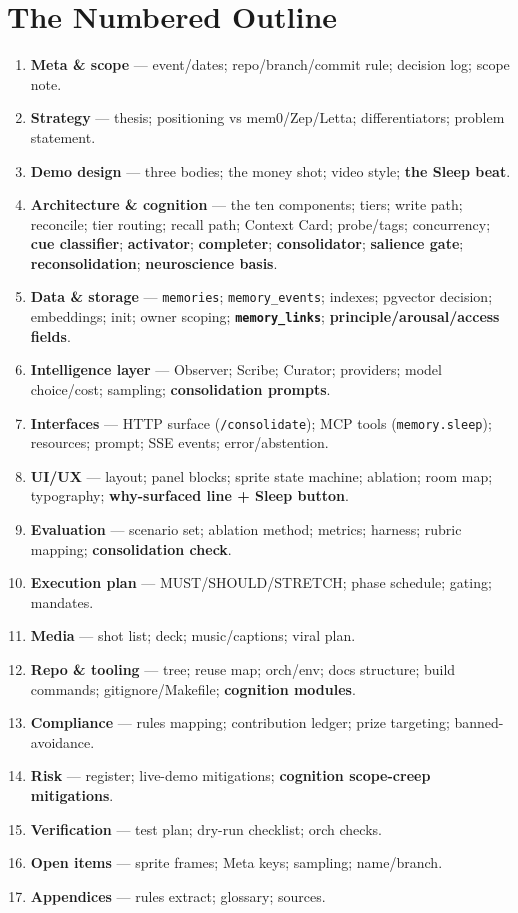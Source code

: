 \section{The Numbered Outline}
\begin{enumerate}
  \item \textbf{Meta \& scope} --- event/dates; repo/branch/commit rule; decision log; scope note.
  \item \textbf{Strategy} --- thesis; positioning vs mem0/Zep/Letta; differentiators; problem statement.
  \item \textbf{Demo design} --- three bodies; the money shot; video style; \textbf{the Sleep beat}.
  \item \textbf{Architecture \& cognition} --- the ten components; tiers; write path; reconcile; tier routing; recall path; Context Card; probe/tags; concurrency; \textbf{cue classifier}; \textbf{activator}; \textbf{completer}; \textbf{consolidator}; \textbf{salience gate}; \textbf{reconsolidation}; \textbf{neuroscience basis}.
  \item \textbf{Data \& storage} --- \texttt{memories}; \texttt{memory\_events}; indexes; pgvector decision; embeddings; init; owner scoping; \textbf{\texttt{memory\_links}}; \textbf{principle/arousal/access fields}.
  \item \textbf{Intelligence layer} --- Observer; Scribe; Curator; providers; model choice/cost; sampling; \textbf{consolidation prompts}.
  \item \textbf{Interfaces} --- HTTP surface (\texttt{/consolidate}); MCP tools (\texttt{memory.sleep}); resources; prompt; SSE events; error/abstention.
  \item \textbf{UI/UX} --- layout; panel blocks; sprite state machine; ablation; room map; typography; \textbf{why-surfaced line + Sleep button}.
  \item \textbf{Evaluation} --- scenario set; ablation method; metrics; harness; rubric mapping; \textbf{consolidation check}.
  \item \textbf{Execution plan} --- MUST/SHOULD/STRETCH; phase schedule; gating; mandates.
  \item \textbf{Media} --- shot list; deck; music/captions; viral plan.
  \item \textbf{Repo \& tooling} --- tree; reuse map; orch/env; docs structure; build commands; gitignore/Makefile; \textbf{cognition modules}.
  \item \textbf{Compliance} --- rules mapping; contribution ledger; prize targeting; banned-avoidance.
  \item \textbf{Risk} --- register; live-demo mitigations; \textbf{cognition scope-creep mitigations}.
  \item \textbf{Verification} --- test plan; dry-run checklist; orch checks.
  \item \textbf{Open items} --- sprite frames; Meta keys; sampling; name/branch.
  \item \textbf{Appendices} --- rules extract; glossary; sources.
\end{enumerate}

